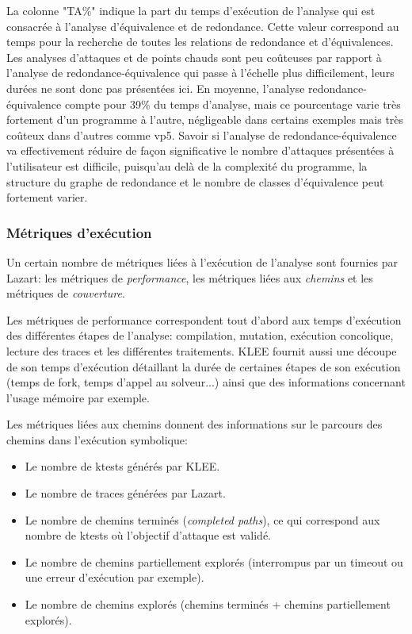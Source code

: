                 La colonne "TA\%" indique la part du temps d'exécution de l'analyse qui est consacrée à l'analyse d'équivalence et de redondance. Cette valeur correspond au temps pour la recherche de toutes les relations de redondance et d'équivalences.
                Les analyses d'attaques et de points chauds sont peu coûteuses par rapport à l'analyse de redondance-équivalence qui passe à l'échelle plus difficilement, leurs durées ne sont donc pas présentées ici. 
                En moyenne, l'analyse redondance-équivalence compte pour 39\% du temps d'analyse, mais ce pourcentage varie très fortement d'un programme à l'autre, négligeable dans certains exemples
                mais très coûteux dans d'autres comme vp5.
                Savoir si l'analyse de redondance-équivalence va effectivement réduire de façon significative le nombre d'attaques présentées à l'utilisateur est difficile, puisqu'au delà de la complexité du programme, la structure du graphe de redondance et le nombre de classes d'équivalence peut fortement varier.
            
            \subsubsection{Métriques d'exécution}
            \label{sec:lz:exp:exec}
            
                Un certain nombre de métriques liées à l'exécution de l'analyse sont fournies par Lazart: les métriques de \textit{performance}, les métriques liées aux \textit{chemins} et les métriques de \textit{couverture}.
                
                Les métriques de performance correspondent tout d'abord aux temps d'exécution des différentes étapes de l'analyse: compilation, mutation, exécution concolique, lecture des traces et les différentes traitements.
                KLEE fournit aussi une découpe de son temps d'exécution détaillant la durée de certaines étapes de son exécution (temps de fork, temps d'appel au solveur...) ainsi que des informations concernant l'usage mémoire par exemple.
                
                Les métriques liées aux chemins donnent des informations sur le parcours des chemins dans l'exécution symbolique:
                \begin{itemize}
                    \item Le nombre de ktests générés par KLEE.
                    \item Le nombre de traces générées par Lazart. 
                    \item Le nombre de chemins terminés (\textit{completed paths}), ce qui correspond aux nombre de ktests où l'objectif d'attaque est validé. 
                    \item Le nombre de chemins partiellement explorés (interrompus par un timeout ou une erreur d'exécution par exemple).
                    \item Le nombre de chemins explorés (chemins terminés + chemins partiellement explorés). 
                \end{itemize}
                
